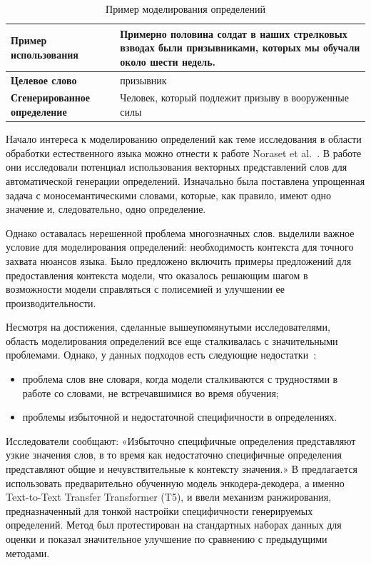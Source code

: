 \documentclass[LI,VKR]{HSEUniversity}
\begin{document}
\begin{table}[H]
\centering
\caption{Пример моделирования определений}
\label{tab:Definition modeling example}
\begin{tabular}{|l|p{8cm}|}
\hline
\textbf{Пример использования} & Примерно половина солдат в наших стрелковых взводах были призывниками, которых мы обучали около шести недель. \\
\hline
\textbf{Целевое слово} & призывник \\
\hline
\textbf{Сгенерированное определение} & Человек, который подлежит призыву в вооруженные силы \\
\hline
\end{tabular}
\end{table}

Начало интереса к моделированию определений как теме исследования
в области обработки естественного языка можно отнести
к работе Noraset et al.~\cite{noraset2016definition}.
В работе они исследовали потенциал использования векторных представлений слов
для автоматической генерации определений.
Изначально была поставлена упрощенная задача с моносемантическими словами,
которые, как правило, имеют одно значение и, следовательно, одно определение.

Однако оставалась нерешенной проблема многозначных слов.
\cite{gadetsky-etal-2018-conditional} выделили важное условие для моделирования определений:
необходимость контекста для точного захвата нюансов языка.
Было предложено включить примеры предложений для предоставления контекста модели,
что оказалось решающим шагом в возможности модели справляться с полисемией и улучшении
ее производительности.

Несмотря на достижения, сделанные вышеупомянутыми исследователями,
область моделирования определений все еще сталкивалась с значительными проблемами.
Однако, у данных подходов есть следующие недостатки~\cite{huang-etal-2021-definition}:
\begin{itemize}
    \item проблема слов вне словаря, когда модели сталкиваются с трудностями в работе со словами,
не встречавшимися во время обучения;
    \item проблемы избыточной и недостаточной специфичности в определениях.
\end{itemize}
Исследователи сообщают: «Избыточно специфичные определения представляют узкие значения слов,
в то время как недостаточно специфичные определения представляют общие и
нечувствительные к контексту значения.»
В \cite{huang-etal-2021-definition} предлагается использовать предварительно обученную модель энкодера-декодера,
а именно Text-to-Text Transfer Transformer (T5),
и ввели механизм ранжирования, предназначенный для тонкой настройки специфичности
генерируемых определений.
Метод был протестирован на стандартных наборах данных для оценки и показал значительное
улучшение по сравнению с предыдущими методами.
\end{document}
